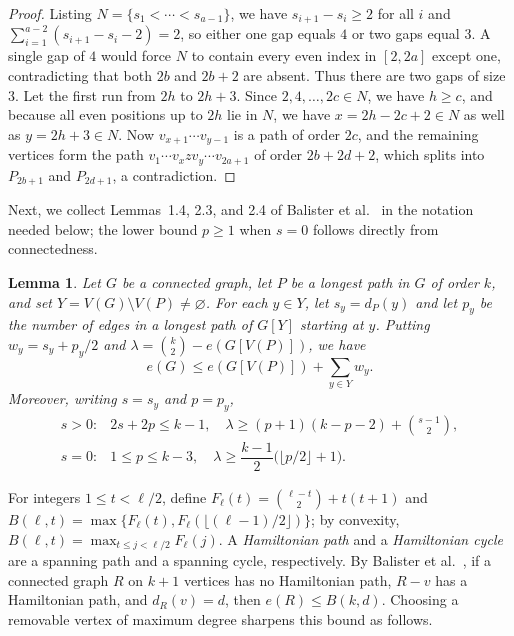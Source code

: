 \documentclass[10pt]{article}
\theoremstyle{compactplain}
\newtheorem{lemma}[theorem]{Lemma}
\theoremstyle{remark}\newtheorem{remark}[theorem]{Remark}
\begin{document}
\begin{proof}
Listing $N=\{s_1<\cdots<s_{a-1}\}$, we have $s_{i+1}-s_i\ge2$ for all
$i$ and $\sum_{i=1}^{a-2}(s_{i+1}-s_i-2)=2$, so either one gap equals
$4$ or two gaps equal $3$. A single gap of $4$ would force $N$ to
contain every even index in $[2,2a]$ except one, contradicting that both
$2b$ and $2b+2$ are absent. Thus there are two gaps of size $3$. Let the
first run from $2h$ to $2h+3$. Since $2,4,\ldots,2c\in N$, we have
$h\ge c$, and because all even positions up to $2h$ lie in $N$, we have
$x=2h-2c+2\in N$ as well as $y=2h+3\in N$. Now $v_{x+1}\cdots v_{y-1}$
is a path of order $2c$, and the remaining vertices form the path
$v_1\cdots v_x z v_y\cdots v_{2a+1}$ of order $2b+2d+2$, which splits
into $P_{2b+1}$ and $P_{2d+1}$, a contradiction.
\end{proof}

Next, we collect Lemmas~1.4, 2.3, and 2.4 of Balister et
al.~\cite{BGLS} in the notation needed below; the lower bound $p\ge1$
when $s=0$ follows directly from connectedness.

\begin{lemma}\label{lem:bgls-weights}
Let $G$ be a connected graph, let $P$ be a longest path in $G$ of order
$k$, and set $Y=V(G)\setminus V(P)\ne\varnothing$. For each $y\in Y$,
let $s_y=d_P(y)$ and let $p_y$ be the number of edges in a longest path
of $G[Y]$ starting at $y$. Putting $w_y=s_y+p_y/2$ and
$\lambda=\binom{k}{2}-e(G[V(P)])$, we have
\begin{equation}\label{eq:weights}
 e(G)\le e(G[V(P)])+\sum_{y\in Y}w_y.
\end{equation}
Moreover, writing $s=s_y$ and $p=p_y$,
\[
\begin{array}{ll}
 s>0: & 2s+2p\le k-1,\quad
 \lambda\ge(p+1)(k-p-2)+\binom{s-1}{2},\\[1mm]
 s=0: & 1\le p\le k-3,\quad
 \lambda\ge\dfrac{k-1}{2}\bigl(\lfloor p/2\rfloor+1\bigr).
\end{array}
\]
\end{lemma}

For integers $1\le t<\ell/2$, define
$F_\ell(t)=\binom{\ell-t}{2}+t(t+1)$ and
$B(\ell,t)=\max\{F_\ell(t),F_\ell(\lfloor(\ell-1)/2\rfloor)\}$; by
convexity, $B(\ell,t)=\max_{t\le j<\ell/2}F_\ell(j)$. A
\emph{Hamiltonian path} and a \emph{Hamiltonian cycle} are a spanning
path and a spanning cycle, respectively. By Balister et
al.~\cite[Lemma~2.2, equations~(2.1)--(2.2)]{BGLS}, if a connected graph
$R$ on $k+1$ vertices has no Hamiltonian path, $R-v$ has a Hamiltonian
path, and $d_R(v)=d$, then $e(R)\le B(k,d)$. Choosing a removable vertex
of maximum degree sharpens this bound as follows.
\end{document}
